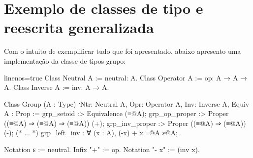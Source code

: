 \section{Exemplo de classes de tipo e reescrita generalizada}\label{sec:exemplos}
Com o intuito de exemplificar tudo que foi apresentado, abaixo apresento uma implementação da classe de tipos grupo:\\
\begin{minipage}[t]{0.5\linewidth}
\begin{coqcode*}{linenos=true}
Class Neutral A := neutral: A.
Class Operator A := op: A → A → A.
Class Inverse A := inv: A → A.

Class Group (A : Type)
  `{Ntr: Neutral A, Opr: Operator A, Inv: Inverse A, Equiv A} : Prop := {
	grp_setoid :> Equivalence (≡@{A});
	grp_op_proper :> Proper ((≡@{A}) ⇒ (≡@{A}) ⇒ (≡@{A})) (+);
	grp_inv_proper :> Proper ((≡@{A}) ⇒ (≡@{A})) (-);
	(* ... *)
	grp_left_inv : ∀ (x : A), (-x) + x ≡@{A} ɛ@{A};
}.
\end{coqcode*}
\end{minipage}
\hspace{-1em}
\begin{minipage}[t]{0.5\linewidth}
\begin{coqcode}
Notation ɛ := neutral.
Infix "+" := op.
Notation "- x" := (inv x).
\end{coqcode}
\end{minipage}\vspace*{.6em}\\
